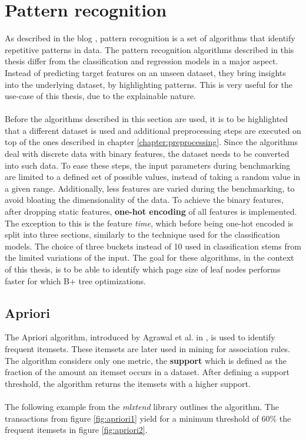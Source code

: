 \section{Pattern recognition}\label{patternreg}
As described in the blog \parencite{Frequent45:online}, pattern recognition is a set of algorithms that identify repetitive patterns in data. The pattern recognition algorithms described in this thesis differ from the classification and regression models in a major aspect. Instead of predicting target features on an unseen dataset, they bring insights into the underlying dataset, by highlighting patterns. This is very useful for the use-case of this thesis, due to the explainable nature.
\\\\
Before the algorithms described in this section are used, it is to be highlighted that a different dataset is used and additional preprocessing steps are executed on top of the ones described in chapter \ref{chapter:preprocessing}. Since the algorithms deal with discrete data with binary features, the dataset needs to be converted into such data. To ease these steps, the input parameters during benchmarking are limited to a defined set of possible values, instead of taking a random value in a given range. Additionally, less features are varied during the benchmarking, to avoid bloating the dimensionality of the data. To achieve the binary features, after dropping static features, \textbf{one-hot encoding} of all features is implemented. The exception to this is the feature \textit{time}, which before being one-hot encoded is split into three sections, similarly to the technique used for the classification models. The choice of three buckets instead of 10 used in classification stems from the limited variations of the input. The goal for these algorithms, in the context of this thesis, is to be able to identify which page size of leaf nodes performs faster for which B+ tree optimizations. 

\subsection{Apriori}
The Apriori algorithm, introduced by Agrawal et al. in \parencite{agrawal1994fast}, is used to identify frequent itemsets. These itemsets are later used in mining for association rules. The algorithm considers only one metric, the \textbf{support} which is defined as the fraction of the amount an itemset occurs in a dataset. After defining a support threshold, the algorithm returns the itemsets with a higher support. 
\\\\
The following example from the \textit{mlxtend} library \parencite{Apriorim11:online} outlines the algorithm. The transactions from figure \ref{fig:apriori1} yield for a minimum threshold of $60\%$ the frequent itemsets in figure \ref{fig:apriori2}.


